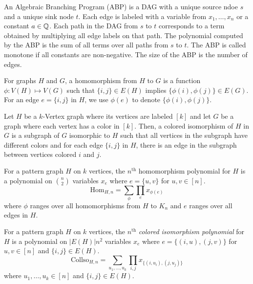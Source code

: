 \begin{definition}
    An Algebraic Branching Program (ABP) is a DAG with a unique source ndoe $s$ and a unique sink node $t$. Each edge is labeled with a variable from $x_1,\dots,x_n$ or a constant $a\in\mathbb{Q}$. Each path in the DAG from $s$ to $t$ corresponds to a term obtained by multiplying all edge labels on that path. The polynomial computed by the ABP is the sum of all terms over all paths from $s$ to $t$. The ABP is called monotone if all constants are non-negative. The size of the ABP is the number of edges.
\end{definition}

\begin{definition}\label{def:hom}
    For graphs $H$ and $G$, a homomorphism from $H$ to $G$ is a function $\phi:V(H)\mapsto V(G)$ such that $\{i,j\}\in E(H)$ implies $\{\phi(i),\phi(j)\}\in E(G)$. For an edge $e=\{i,j\}$ in $H$, we use $\phi(e)$ to denote $\{\phi(i),\phi(j)\}$.
\end{definition}

\begin{definition}\label{def:col-iso}
    Let $H$ be a $k$-Vertex graph where its vertices are labeled $[k]$ and let $G$ be a graph where each vertex has a color in $[k]$. Then, a colored isomorphism of $H$ in $G$ is a subgraph of $G$ isomorphic to $H$ such that all vertices in the subgraph have different colors and for each edge $\{i,j\}$ in $H$, there is an edge in the subgraph between vertices colored $i$ and $j$.
\end{definition}

\begin{definition}\label{def:hom-poly}
    For a pattern graph $H$ on $k$ vertices, the $n^{\text{th}}$ homomorphism polynomial for $H$ is a polynomial on $\binom{n}{2}$ variables $x_e$ where $e=\{u,v\}$ for $u,v\in [n]$.
    \[\text{Hom}_{H,n}=\sum\limits_{\phi}\prod\limits_e x_{\phi(e)}\]
    where $\phi$ ranges over all homomorphisms from $H$ to $K_n$ and $e$ ranges over all edges in $H$.
\end{definition}

\begin{definition}\label{def:col-iso-poly}
    For a pattern graph $H$ on $k$ vertices, the $n^{\text{th}}$ \textit{colored isomorphism polynomial} for $H$ is a polynomial on $|E(H)|n^2$ variables $x_e$ where $e=\{(i,u),(j,v)\}$ for $u,v\in [n]$ and $\{i,j\}\in E(H)$.
    \[ \text{Collso}_{H,n}=\sum\limits_{u_1,\dots,u_k}\prod\limits_{i,j} x_{\{(i,u_i),(j,u_j)\}} \]
    where $u_1,\dots,u_k\in [n]$ and $\{i,j\}\in E(H)$.
\end{definition}

